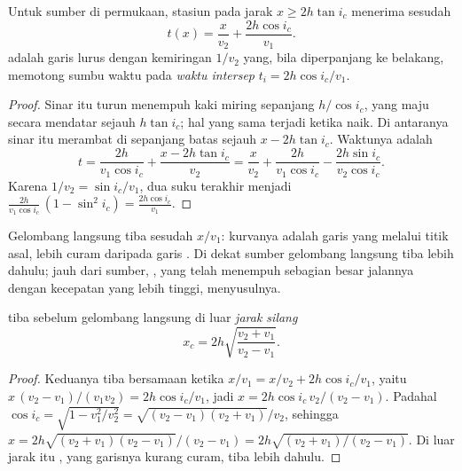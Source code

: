 \begin{proposition}\label{prop:g11:seismic-structure:head-wave}
Untuk sumber di permukaan, stasiun pada jarak $x \ge 2h\tan i_c$
menerima  sesudah
\[
  t(x) = \frac{x}{v_2} + \frac{2h\cos i_c}{v_1}.
\]
 adalah garis lurus dengan kemiringan $1/v_2$ yang, bila
diperpanjang ke belakang, memotong sumbu waktu pada \emph{waktu
intersep} $t_i = 2h\cos i_c/v_1$.
\end{proposition}

\begin{proof}
Sinar itu turun menempuh kaki miring sepanjang $h/\cos i_c$, yang maju secara
mendatar sejauh $h\tan i_c$; hal yang sama terjadi ketika naik. Di antaranya
sinar itu merambat di sepanjang batas sejauh $x - 2h\tan i_c$. Waktunya adalah
\[
  t = \frac{2h}{v_1\cos i_c} + \frac{x - 2h\tan i_c}{v_2}
    = \frac{x}{v_2} + \frac{2h}{v_1\cos i_c} - \frac{2h\sin i_c}{v_2\cos i_c}.
\]
Karena $1/v_2 = \sin i_c/v_1$, dua suku terakhir menjadi
$\frac{2h}{v_1\cos i_c}\,(1 - \sin^2 i_c) = \frac{2h\cos i_c}{v_1}$.
\end{proof}

Gelombang langsung tiba sesudah $x/v_1$: kurvanya adalah garis yang melalui
titik asal, lebih curam daripada garis . Di dekat sumber
gelombang langsung tiba lebih dahulu; jauh dari sumber, , yang
telah menempuh sebagian besar jalannya dengan kecepatan yang lebih tinggi,
menyusulnya.

\begin{proposition}\label{prop:g11:seismic-structure:crossover}
 tiba sebelum gelombang langsung di luar \emph{jarak
silang}
\[
  x_c = 2h\sqrt{\frac{v_2 + v_1}{v_2 - v_1}}.
\]
\end{proposition}

\begin{proof}
Keduanya tiba bersamaan ketika $x/v_1 = x/v_2 + 2h\cos i_c/v_1$, yaitu
$x\,(v_2 - v_1)/(v_1 v_2) = 2h\cos i_c/v_1$, jadi $x = 2h\cos i_c\,v_2/(v_2 -
v_1)$. Padahal $\cos i_c = \sqrt{1 - v_1^2/v_2^2} = \sqrt{(v_2 - v_1)(v_2 +
v_1)}/v_2$, sehingga $x = 2h\sqrt{(v_2 + v_1)(v_2 - v_1)}/(v_2 - v_1) =
2h\sqrt{(v_2 + v_1)/(v_2 - v_1)}$. Di luar jarak itu , yang
garisnya kurang curam, tiba lebih dahulu.
\end{proof}

